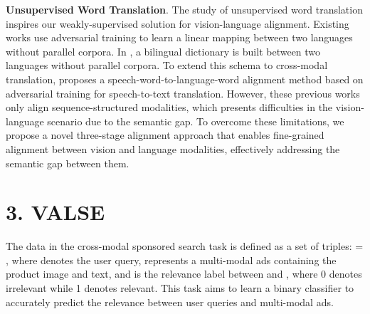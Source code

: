 \documentclass[letterpaper]{article} \usepackage{aaai24}  \usepackage{times}  \usepackage{helvet}  \usepackage{courier}  \usepackage[hyphens]{url}  \usepackage{graphicx} \urlstyle{rm} \def\UrlFont{\rm}  \usepackage{natbib}  \usepackage{caption} \frenchspacing  \setlength{\pdfpagewidth}{8.5in}  \setlength{\pdfpageheight}{11in}
\begin{document}
\noindent\textbf{Unsupervised Word Translation}. The study of unsupervised word translation inspires our weakly-supervised solution for vision-language alignment. Existing works \cite{lample2018word,artetxe2019effective,pourdamghani2019translating} use adversarial training to learn a linear mapping between two languages without parallel corpora. In \cite{lample2018word}, a bilingual dictionary is built between two languages without parallel corpora. To extend this schema to cross-modal translation, \cite{chung2018unsupervised} proposes a speech-word-to-language-word alignment method based on adversarial training for speech-to-text translation. However, these previous works only align sequence-structured modalities, which presents difficulties in the vision-language scenario due to the semantic gap. To overcome these limitations, we propose a novel three-stage alignment approach that enables fine-grained alignment between vision and language modalities, effectively addressing the semantic gap between them.

\section{3. VALSE}
\label{sec:VALSE}
The data in the cross-modal sponsored search task is defined as a set of triples:  = , where  denotes the user query,  represents a multi-modal ads containing the product image and text, and  is the relevance label between  and , where 0 denotes irrelevant while 1 denotes relevant. This task aims to learn a binary classifier  to accurately predict the relevance between user queries and multi-modal ads. 
\end{document}
